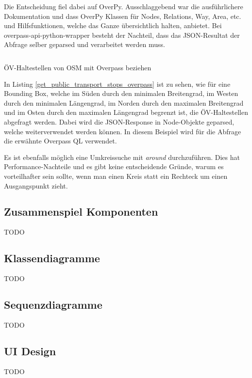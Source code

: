 Die Entscheidung fiel dabei auf OverPy. Ausschlaggebend war die ausführlichere Dokumentation und dass OverPy Klassen für Nodes, Relations, Way, Area, etc. und Hilfsfunktionen, welche das Ganze übersichtlich halten, anbietet. Bei overpass-api-python-wrapper besteht der Nachteil, dass das JSON-Resultat der Abfrage selber geparsed und verarbeitet werden muss.

\begin{listing}[ht]
    \inputminted{python}{projectdoc/listing/get_public_transport_stops_overpass.py}
    \caption{ÖV-Haltestellen von \acs{OSM} mit Overpass beziehen}
    \label{get_public_transport_stops_overpass}
\end{listing}

In Listing \ref{get_public_transport_stops_overpass} ist zu sehen, wie für eine Bounding Box, welche im Süden durch den minimalen Breitengrad, im Westen durch den minimalen Längengrad, im Norden durch den maximalen Breitengrad und im Osten durch den maximalen Längengrad begrenzt ist, die ÖV-Haltestellen abgefragt werden. Dabei wird die JSON-Response in Node-Objekte geparsed, welche weiterverwendet werden können. In diesem Beispiel wird für die Abfrage die erwähnte Overpass QL verwendet.

Es ist ebenfalls möglich eine Umkreissuche mit \textit{around} durchzuführen. Dies hat Performance-Nachteile und es gibt keine entscheidende Gründe, warum es vorteilhafter sein sollte, wenn man einen Kreis statt ein Rechteck um einen Ausgangspunkt zieht.

\subsection{Zusammenspiel Komponenten}
\label{sub:Zusammenspiel Komponenten}
TODO

\subsection{Klassendiagramme}
\label{sub:Klassendiagramme}

TODO

\subsection{Sequenzdiagramme}
\label{sub:Sequenzdiagramme}

TODO

\subsection{UI Design}
\label{sub:UI Design}

TODO